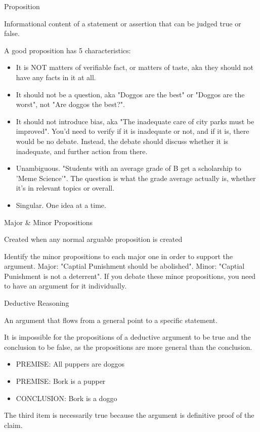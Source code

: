 \documentclass[]{../../DefinitionFormat}
\begin{document}
\begin{definition}{Proposition}
	\begin{summary}
		Informational content of a statement or assertion that can be judged true or false.
	\end{summary}
	\par A good proposition has 5 characteristics:
		\begin{itemize}
			\item It is NOT matters of verifiable fact, or matters of taste, aka they should not have any facts in it at all.
			\item It should not be a question, aka "Doggos are the best" or "Doggos are the worst", not "Are doggos the best?".
			\item It should not introduce bias, aka "The inadequate care of city parks must be improved". You'd need to verify if it is inadequate or not, and if it is, there would be no debate. Instead, the debate should discuss whether it is inadequate, and further action from there.
			\item Unambiguous. "Students with an average grade of B get a scholarship to 'Meme Science'". The question is what the grade average actually is, whether it's in relevant topics or overall.
			\item Singular. One idea at a time.
		\end{itemize}
		
\end{definition}

\begin{definition}{Major \& Minor Propositions}
	\begin{summary}
		Created when any normal arguable proposition is created
	\end{summary}
	
	\par Identify the minor propositions to each major one in order to support the argument. Major: "Captial Punishment should be abolished". Minor: "Captial Punishment is not a deterrent". If you debate these minor propositions, you need to have an argument for it individually.
\end{definition}

\begin{definition}{Deductive Reasoning}
	\begin{summary}
		An argument that flows from a general point to a specific statement.
	\end{summary}
	
	\par It is impossible for the propositions of a deductive argument to be true and the conclusion to be false, as the propositions are more general than the conclusion. 
	\begin{itemize}[label={}]
		\item PREMISE: All puppers are doggos
		\item PREMISE: Bork is a pupper
		\item CONCLUSION: Bork is a doggo
	\end{itemize}
	\par The third item is necessarily true because the argument is definitive proof of the claim.
\end{definition}
\end{document}
